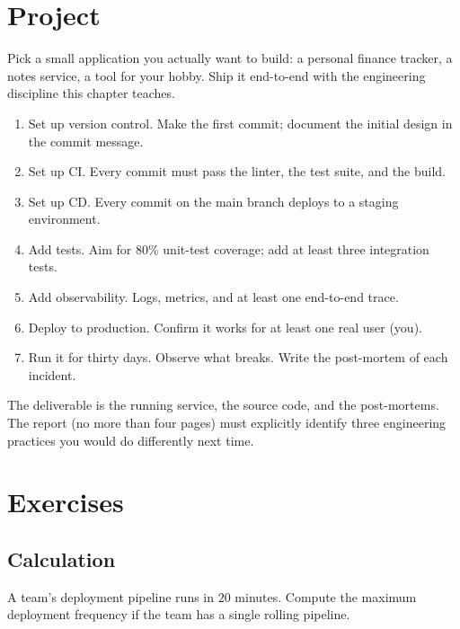 \section{Project}

\begin{project}
Pick a small application you actually want to build: a personal finance tracker, a notes service, a tool for your hobby. Ship it end-to-end with the engineering discipline this chapter teaches.

\begin{enumerate}[leftmargin=*]
  \item Set up version control. Make the first commit; document the initial design in the commit message.
  \item Set up CI. Every commit must pass the linter, the test suite, and the build.
  \item Set up CD. Every commit on the main branch deploys to a staging environment.
  \item Add tests. Aim for $80\%$ unit-test coverage; add at least three integration tests.
  \item Add observability. Logs, metrics, and at least one end-to-end trace.
  \item Deploy to production. Confirm it works for at least one real user (you).
  \item Run it for thirty days. Observe what breaks. Write the post-mortem of each incident.
\end{enumerate}

The deliverable is the running service, the source code, and the post-mortems. The report (no more than four pages) must explicitly identify three engineering practices you would do differently next time.
\end{project}

\section{Exercises}

\subsection*{Calculation}

\begin{exercise}
A team's deployment pipeline runs in $20$ minutes. Compute the maximum deployment frequency if the team has a single rolling pipeline.
\end{exercise}

